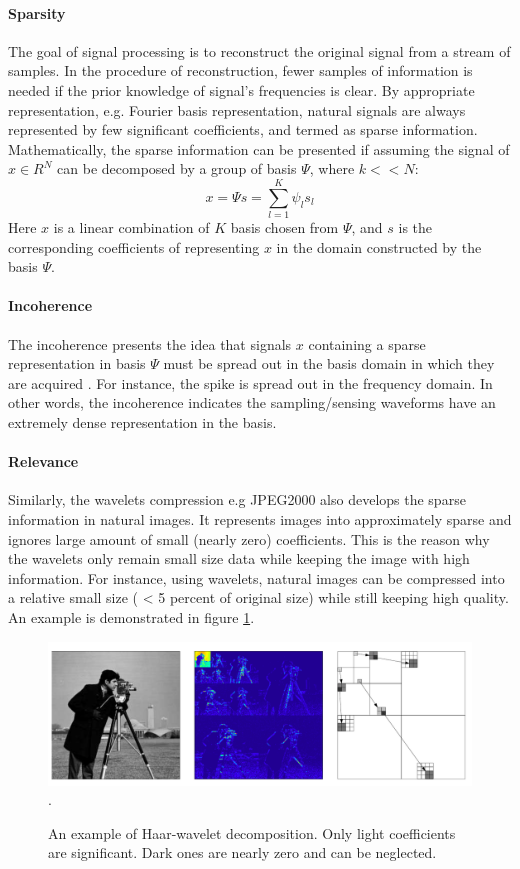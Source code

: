 \paragraph{Sparsity}
The goal of signal processing is to reconstruct the original signal from a stream of samples. In the procedure of reconstruction, fewer samples of information is needed if the prior knowledge of signal’s frequencies is clear. By appropriate representation, e.g. Fourier basis representation, natural signals are always represented by few significant coefficients, and termed as sparse information. Mathematically, the sparse information can be presented if assuming the signal of $x \in R^N$ can be decomposed by a group of basis $\Psi$, where $k << N$:  
\begin{equation}
x=\Psi s=\sum_{l=1}^{K}\psi_l s_l  
\end{equation}
Here $x$ is a linear combination of $K$ basis chosen from $\Psi$, and $s$ is the corresponding coefficients of representing $x$ in the domain constructed by the basis $\Psi$. 

\paragraph{Incoherence}
The incoherence presents the idea that signals $x$ containing a sparse representation in basis $\Psi$ must be spread out in the basis domain in which they are acquired \cite{candes2008introduction}. For instance, the spike is spread out in the frequency domain. In other words, the incoherence indicates the sampling/sensing waveforms have an extremely dense representation in the basis. 

\paragraph{Relevance}
Similarly, the wavelets compression \cite{chui1992introduction} e.g JPEG2000 also develops the sparse information in natural images. It represents images into approximately sparse and ignores large amount of small (nearly zero) coefficients. This is the reason why the wavelets only remain small size data while keeping the image with high information. For instance, using wavelets, natural images can be compressed into a relative small size ( < 5 percent of original size) while still keeping high quality. An example is demonstrated in figure \ref{I:wavelet-intro}.

\begin{figure}
\label{I:wavelet-intro}
\centering
\includegraphics[width=5.0in]{figs/wavelets-intro.png}
\DeclareGraphicsExtensions.
\caption{An example of Haar-wavelet decomposition. Only light coefficients are significant. Dark ones are nearly zero and can be neglected.}
\end{figure}

